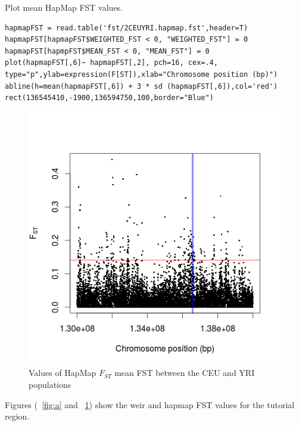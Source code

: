 \documentclass[a4paper,10pt]{article}
\begin{document}
\noindent
Plot mean HapMap FST values.\\
\begin{verbatim}
hapmapFST = read.table('fst/2CEUYRI.hapmap.fst',header=T) 
hapmapFST[hapmapFST$WEIGHTED_FST < 0, "WEIGHTED_FST"] = 0
hapmapFST[hapmpFST$MEAN_FST < 0, "MEAN_FST"] = 0
plot(hapmapFST[,6]~ hapmapFST[,2], pch=16, cex=.4, 
type="p",ylab=expression(F[ST]),xlab="Chromosome position (bp)") 
abline(h=mean(hapmapFST[,6]) + 3 * sd (hapmapFST[,6]),col='red')
rect(136545410,-1900,136594750,100,border="Blue") 
\end{verbatim}
\begin{figure}
\centering
\includegraphics{pictures/hapmapCEUYRI.png}
\caption{Values of HapMap $F_{ST}$ mean FST between the CEU and YRI populations}
\label{fig:hapmapfst}
\end{figure}

\noindent 
Figures (~\ref{fig:a} and ~\ref{fig:hapmapfst}) show the weir and hapmap FST values for the tutorial region.
\end{document}
